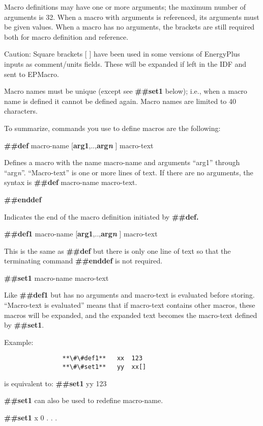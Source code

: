 Macro definitions may have one or more arguments; the maximum number of arguments is 32. When a macro with arguments is referenced, its arguments must be given values. When a macro has no arguments, the brackets are still required both for macro definition and reference.

Caution: Square brackets {[} {]} have been used in some versions of EnergyPlus inputs as comment/units fields. These will be expanded if left in the IDF and sent to EPMacro.

Macro names must be unique (except see \textbf{\#\#set1} below); i.e., when a macro name is defined it cannot be defined again. Macro names are limited to 40 characters.

To summarize, commands you use to define macros are the following:

\textbf{\#\#def} macro-name {[}\textbf{arg1},..,\textbf{arg\emph{n}} {]} macro-text

Defines a macro with the name macro-name and arguments ``arg1'' through ``arg\emph{n}''. ``Macro-text'' is one or more lines of text. If there are no arguments, the syntax is \textbf{\#\#def} macro-name macro-text.

\textbf{\#\#enddef}

Indicates the end of the macro definition initiated by \textbf{\#\#def.}

\textbf{\#\#def1} macro-name {[}\textbf{arg1},..,\textbf{arg\emph{n}} {]} macro-text

This is the same as \textbf{\#\#def} but there is only one line of text so that the terminating command \textbf{\#\#enddef} is not required.

\textbf{\#\#set1} macro-name macro-text

Like \textbf{\#\#def1} but has no arguments and macro-text is evaluated before storing. ``Macro-text is evaluated'' means that if macro-text contains other macros, these macros will be expanded, and the expanded text becomes the macro-text defined by \textbf{\#\#set1}.

Example:

\begin{lstlisting}
                **\#\#def1**   xx  123
                **\#\#set1**   yy  xx[]
\end{lstlisting}

is equivalent to: \textbf{\#\#set1} yy 123

\textbf{\#\#set1} can also be used to redefine macro-name.

\textbf{\#\#set1} x 0 . . .

